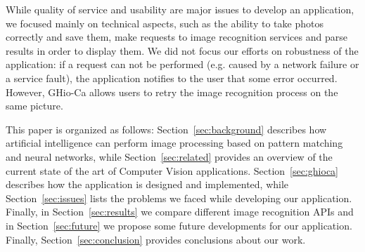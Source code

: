 While quality of service and usability are major issues to develop an 
application, we focused mainly on technical aspects, such as the ability to 
take photos correctly and save them, make requests to image recognition 
services and parse results in order to display them. We did not focus our 
efforts on robustness of the application: if a request can not be performed 
(e.g. caused by a network failure or a service fault), the application notifies 
to the user that some error occurred. However, GHio-Ca allows users to retry the 
image recognition process on the same picture.

This paper is organized as follows: Section~\ref{sec:background} describes how 
artificial intelligence can perform image processing based on pattern matching 
and neural networks, while Section~\ref{sec:related} provides an overview of 
the current state of the art of Computer Vision applications. 
Section~\ref{sec:ghioca} describes how the application is designed and 
implemented, while Section~\ref{sec:issues} lists the problems we faced while 
developing our application. Finally, in Section~\ref{sec:results} we compare 
different image recognition APIs and in Section~\ref{sec:future} we propose some 
future developments for our application. Finally, Section~\ref{sec:conclusion} 
provides conclusions about our work.
